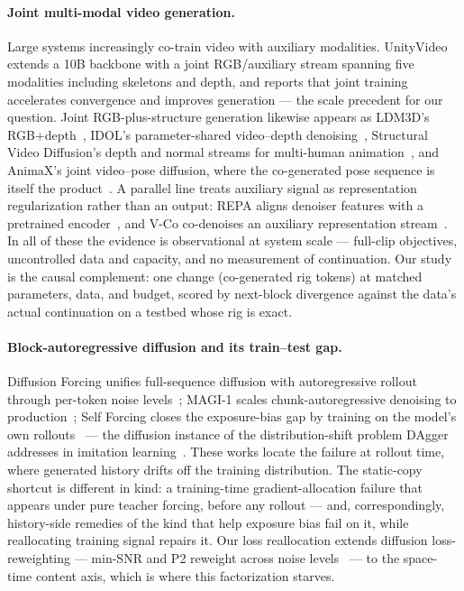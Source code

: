 \documentclass[10pt,twocolumn]{article}
\begin{document}
\paragraph{Joint multi-modal video generation.} Large systems increasingly co-train video with auxiliary modalities.
UnityVideo~\cite{huang2025unityvideo} extends a 10B backbone with a joint RGB/auxiliary stream spanning five
modalities including skeletons and depth, and reports that joint training accelerates convergence and improves
generation — the scale precedent for our question. Joint RGB-plus-structure generation likewise appears as LDM3D's
RGB+depth~\cite{stan2023ldm3d}, IDOL's parameter-shared video--depth denoising~\cite{zhai2024idol}, Structural Video
Diffusion's depth and normal streams for multi-human animation~\cite{wang2025svd}, and AnimaX's joint video--pose
diffusion, where the co-generated pose sequence is itself the product~\cite{huang2025animax}. A parallel line treats
auxiliary signal as representation regularization rather than an output: REPA aligns denoiser features with a
pretrained encoder~\cite{yu2024repa}, and V-Co co-denoises an auxiliary representation stream~\cite{lin2026vco}. In
all of these the evidence is observational at system scale — full-clip objectives, uncontrolled data and capacity,
and no measurement of continuation. Our study is the causal complement: one change (co-generated rig tokens) at
matched parameters, data, and budget, scored by next-block divergence against the data's actual continuation on a
testbed whose rig is exact.

\paragraph{Block-autoregressive diffusion and its train--test gap.} Diffusion Forcing unifies full-sequence
diffusion with autoregressive rollout through per-token noise levels~\cite{chen2024diffusionforcing}; MAGI-1 scales
chunk-autoregressive denoising to production~\cite{magi2025}; Self Forcing closes the exposure-bias gap by training
on the model's own rollouts~\cite{huang2025selfforcing} — the diffusion instance of the distribution-shift problem
DAgger addresses in imitation learning~\cite{ross2011dagger}. These works locate the failure at rollout time, where
generated history drifts off the training distribution. The static-copy shortcut is different in kind: a
training-time gradient-allocation failure that appears under pure teacher forcing, before any rollout — and,
correspondingly, history-side remedies of the kind that help exposure bias fail on it, while reallocating training
signal repairs it. Our loss reallocation extends diffusion loss-reweighting — min-SNR and P2 reweight across noise
levels~\cite{hang2023minsnr,choi2022p2} — to the space-time content axis, which is where this factorization starves.
\end{document}
